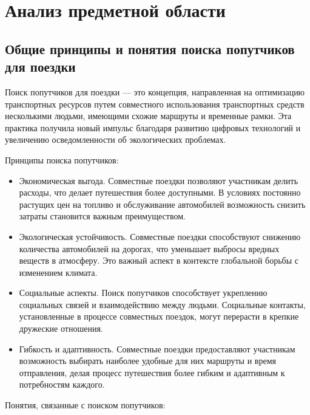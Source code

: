 \section{Анализ предметной области}
\subsection{Общие принципы и понятия поиска попутчиков для поездки}

Поиск попутчиков для поездки — это концепция, направленная на оптимизацию транспортных ресурсов путем совместного использования транспортных средств несколькими людьми, имеющими схожие маршруты и временные рамки. Эта практика получила новый импульс благодаря развитию цифровых технологий и увеличению осведомленности об экологических проблемах.

Принципы поиска попутчиков:

\begin{itemize}
\item Экономическая выгода. Совместные поездки позволяют участникам делить расходы, что делает путешествия более доступными. В условиях постоянно растущих цен на топливо и обслуживание автомобилей возможность снизить затраты становится важным преимуществом.

\item Экологическая устойчивость. Совместные поездки способствуют снижению количества автомобилей на дорогах, что уменьшает выбросы вредных веществ в атмосферу. Это важный аспект в контексте глобальной борьбы с изменением климата.

\item Социальные аспекты. Поиск попутчиков способствует укреплению социальных связей и взаимодействию между людьми. Социальные контакты, установленные в процессе совместных поездок, могут перерасти в крепкие дружеские отношения.

\item Гибкость и адаптивность. Совместные поездки предоставляют участникам возможность выбирать наиболее удобные для них маршруты и время отправления, делая процесс путешествия более гибким и адаптивным к потребностям каждого.
\end{itemize}

Понятия, связанные с поиском попутчиков:

